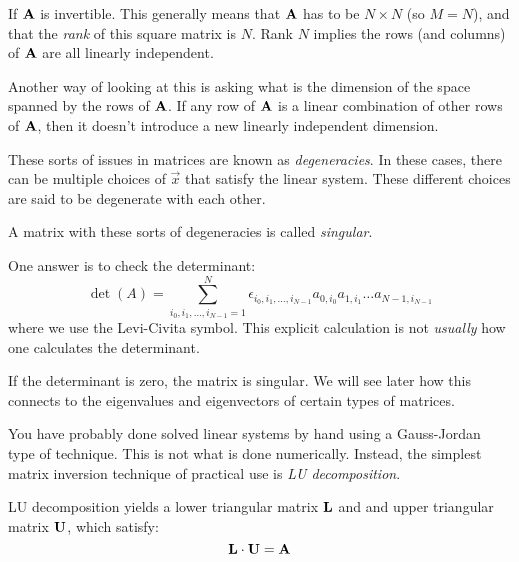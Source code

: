 \begin{answer}
If ${\bf A}$ is invertible. This generally means that ${\bf A}$ has to
be $N\times N$ (so $M=N$), and that the {\it rank} of this square
matrix is $N$. Rank $N$ implies the rows (and columns) of ${\bf A}$
are all linearly independent.

Another way of looking at this is asking what is the dimension of the
space spanned by the rows of ${\bf A}$. If any row of ${\bf A}$ is a
linear combination of other rows of ${\bf A}$, then it doesn't
introduce a new linearly independent dimension.

These sorts of issues in matrices are known as {\it degeneracies}. In
these cases, there can be multiple choices of $\vec{x}$ that satisfy
the linear system. These different choices are said to be degenerate
with each other.

A matrix with these sorts of degeneracies is called {\it singular}.
\end{answer}


\begin{answer}
  One answer is to check the determinant:
\begin{equation}
\label{eq:det}
\det(A) = \sum_{i_0, i_1, \ldots, i_{N-1} = 1}^{N} \epsilon_{i_0, i_1,
  \ldots, i_{N-1}} a_{0,i_0} a_{1,i_1} \ldots a_{{N-1}, i_{N-1}}
\end{equation}
where we use the Levi-Civita symbol. This explicit calculation is not
{\it usually} how one calculates the determinant.

If the determinant is zero, the matrix is singular. We will see later
how this connects to the eigenvalues and eigenvectors of certain types
of matrices.
\end{answer}

You have probably done solved linear systems by hand using a
Gauss-Jordan type of technique.  This is not what is done
numerically. Instead, the simplest matrix inversion technique of
practical use is {\it LU decomposition}.

LU decomposition yields a lower triangular matrix ${\bf L}$ and and
upper triangular matrix ${\bf U}$, which satisfy:
\begin{equation}
{\bf L} \cdot {\bf U} = {\bf A}
\end{equation}

